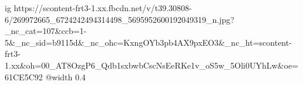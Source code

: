  
 
 
 
 

\ifcmt
  ig https://scontent-frt3-1.xx.fbcdn.net/v/t39.30808-6/269972665_6724242494314498_5695952600192049319_n.jpg?_nc_cat=107&ccb=1-5&_nc_sid=b9115d&_nc_ohc=KxngOYb3pb4AX9pxEO3&_nc_ht=scontent-frt3-1.xx&oh=00_AT8OzgP6_Qdb1sxbwbCscNsEeRKe1v_oS5w_5Oli0UYhLw&oe=61CE5C92
  @width 0.4
\fi
